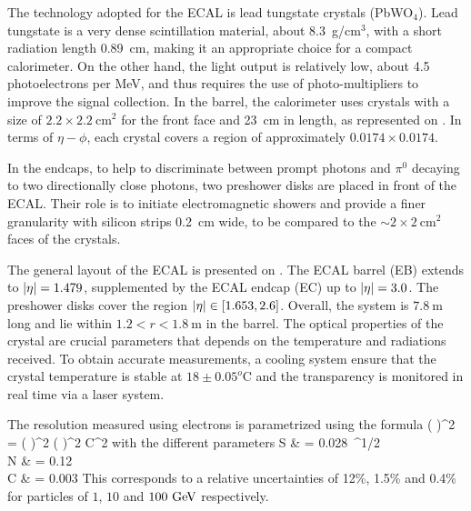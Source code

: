     The technology adopted for the ECAL is lead tungstate crystals (PbWO$_4$). Lead
    tungstate is a very dense scintillation material, about 8.3~g/cm$^3$, with a short
    radiation length 0.89~cm, making it an appropriate choice for a compact calorimeter.
    On the other hand, the light output is relatively low, about 4.5 photoelectrons
    per MeV, and thus requires the use of photo-multipliers to improve the signal collection.
    In the barrel, the calorimeter uses crystals with a size of $2.2\times2.2~\text{cm}^2$
    for the front face and 23~cm in length, as represented on .
    In terms of $\eta-\phi$, each crystal covers a region of approximately $0.0174
    \times 0.0174$.


    In the endcaps, to help to discriminate between prompt photons and $\pi^0$ decaying
    to two directionally close photons, two preshower disks are placed in front of the
    ECAL. Their role is to initiate electromagnetic showers and provide a finer granularity
    with silicon strips 0.2~cm wide, to be compared to the $\sim2\times2~\text{cm}^2$ faces
    of the crystals.


    The general layout of the ECAL is presented on . The ECAL
    barrel (EB) extends to $\left| \eta \right| = 1.479$, supplemented by the ECAL endcap (EC)
    up to $\left| \eta \right| = 3.0$. The preshower disks cover the region $\left| \eta \right| \in [1.653,2.6]$.
    Overall, the system is $7.8~\text{m}$ long and lie within $1.2 < r < 1.8~\text{m}$
    in the barrel.
    The optical properties of the crystal are crucial parameters that depends on the
    temperature and radiations received. To obtain accurate measurements, a cooling
    system ensure that the crystal temperature is stable at $18\pm0.05^o\text{C}$ and the
    transparency is monitored in real time via a laser system.

    The resolution measured using electrons is parametrized using the formula
    {
        \left(  \right)^2
        =
        \left(  \right)^2
        \oplus
        \left(  \right)^2
        \oplus
        C^2
    }
    with the different parameters
    {
        S & = 0.028~^{1/2} \nonumber\\
        N & = 0.12~\\
        C & = 0.003\nonumber
    }
    This corresponds to a relative uncertainties of 12\%, 1.5\% and 0.4\% for particles
    of $1$, $10$ and $100~\text{GeV}$ respectively.

